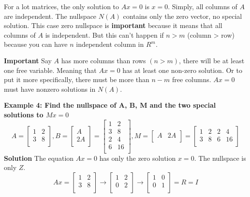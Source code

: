 For a lot matrices, the only solution to \(Ax = 0\) is \(x = 0\). Simply, all columns of \(A\) are independent. The nullspace \(N(A)\) contains only the zero vector, no special solution. This case zero nullspace is \textbf{important} because it means that all columns of \(A\) is independent. But this can't happen if \(n > m\) (column > row) because you can have \(n\) independent column in \(R^m\).   

\textbf{Important} Say \(A\) has more columns than rows \((n > m)\), there will be at least one free variable. Meaning that \(Ax = 0\) has at least one non-zero solution. Or to put it more specifically, there must be more than \(n - m\) free columns. \(Ax = 0\) must have nonzero solutions in \(N(A)\). 

\medbreak

\textbf{Example 4: Find the nullspace of A, B, M and the two special solutions to \(Mx = 0\) }
\[
    A = 
    \begin{bmatrix}
        1 & 2  \\
        3 & 8  \\
    \end{bmatrix}
    ,  
    B =
    \begin{bmatrix}
         A \\
         2A \\
    \end{bmatrix}
    = 
    \begin{bmatrix}
        1 & 2  \\
        3 & 8  \\
        2 & 4  \\
        6 & 16  \\
    \end{bmatrix}
    ,
    M = 
    \begin{bmatrix}
        A & 2A  \\
    \end{bmatrix}
    = 
    \begin{bmatrix}
        1 & 2 & 2 & 4  \\
        3 & 8 & 6 & 16  \\
    \end{bmatrix}
\]
\textbf{Solution} The equation \(Ax = 0\) has only the zero solution \(x = 0\). The nullspace is only \(Z\). 
\[
    Ax = 
    \begin{bmatrix}
        1 & 2  \\
        3 & 8  \\
    \end{bmatrix}
    \rightarrow
    \begin{bmatrix}
        1 & 2  \\
        0 & 2  \\
    \end{bmatrix}
    \rightarrow
    \begin{bmatrix}
        1 & 0  \\
        0 & 1  \\
    \end{bmatrix}
    = R = I
\]   

